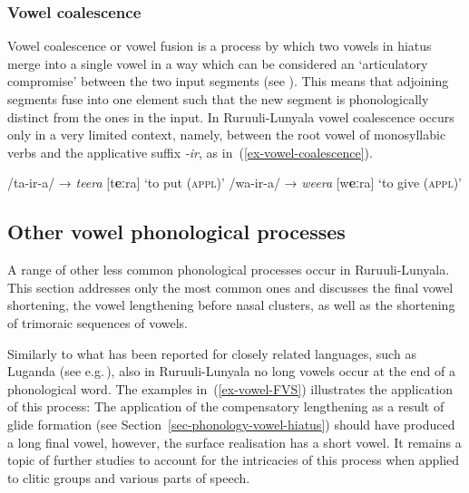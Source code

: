 \subsubsection{Vowel coalescence}\label{sec-phonology-vowel-coalescence}

Vowel coalescence or vowel fusion is a process by which two vowels in hiatus merge into a single vowel in a way which can be considered an ‘articulatory compromise’ between the two input segments (see \citealt[84]{deHaas1988Formal}). 
This means that adjoining segments fuse into one element such that the new segment is phonologically distinct from the ones in the input.  
In Ru\-ruu\-li\hyp{}Lu\-nya\-la vowel coalescence occurs only in a very limited context, namely, between the root vowel of monosyllabic verbs and the applicative suffix  \textit{-ir}, as in~(\ref{ex-vowel-coalescence}).

\ea \label{ex-vowel-coalescence}
\begin{xlist}	
	\ex /ta-ir-a/	→	 \textit{teera} 	     [t\textbf{eː}ra]	‘to put (\textsc{appl})’ 
	\ex /wa-ir-a/	→	 \textit{weera} 	     [w\textbf{eː}ra]	‘to give (\textsc{appl})’ 
\end{xlist}	
\z

\subsection{Other vowel phonological processes}\label{sec-phonology-vowel-elision}\label{sec-phonology-vowel-FVShortening}

A range of other less common phonological processes occur in Ru\-ruu\-li\hyp{}Lu\-nya\-la. 
This section addresses only the most common ones and discusses the final vowel shortening, the vowel lengthening before nasal clusters, as well as the shortening of trimoraic sequences of vowels.

Similarly to what has been reported for closely related languages, such as Luganda (see e.g.\,\citealt{Hymanetal1987Luganda, Hymanetal1990Final}), also in Ru\-ruu\-li\hyp{}Lu\-nya\-la no long vowels occur at the end of a phonological word. 
The examples in~(\ref{ex-vowel-FVS}) illustrates the application of this process: 
The application of the compensatory lengthening as a result of glide formation (see Section~\ref{sec-phonology-vowel-hiatus}) should have produced a long final vowel, however, the surface realisation has a short vowel. 
It remains a topic of further studies to account for the intricacies of this process when applied to clitic groups and various parts of speech.

